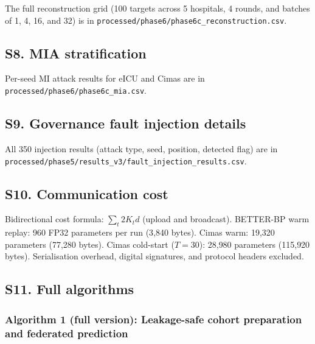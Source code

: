 The full reconstruction grid (100 targets across 5 hospitals, 4 rounds,
and batches of 1, 4, 16, and 32) is in
\texttt{processed/phase6/phase6c\_reconstruction.csv}.

\subsection*{S8. MIA stratification}

Per-seed MI attack results for eICU and Cimas are in
\texttt{processed/phase6/phase6c\_mia.csv}.

\subsection*{S9. Governance fault injection details}

All 350 injection results (attack type, seed, position, detected flag)
are in \texttt{processed/phase5/results\_v3/fault\_injection\_results.csv}.

\subsection*{S10. Communication cost}

Bidirectional cost formula: $\sum_t 2K_t d$ (upload and broadcast).
BETTER-BP warm replay: 960 FP32 parameters per run (3{,}840 bytes).
Cimas warm: 19{,}320 parameters (77{,}280 bytes).
Cimas cold-start ($T=30$): 28{,}980 parameters (115{,}920 bytes).
Serialisation overhead, digital signatures, and protocol headers excluded.

\subsection*{S11. Full algorithms}

\subsubsection*{Algorithm 1 (full version): Leakage-safe cohort preparation
and federated prediction}

